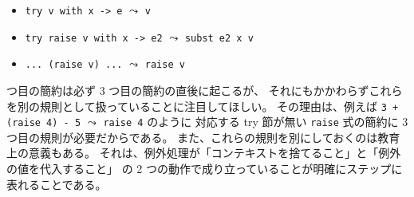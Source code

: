 \begin{itemize}
  \item \texttt{try v with x -> e} $\leadsto$ \texttt{v}
  \item \texttt{try raise v with x -> e2} $\leadsto$ \texttt{subst e2 x v}
  \item \texttt{...\ (raise v) ...} $\leadsto$ \texttt{raise v}
\end{itemize}

 つ目の簡約は必ず 3 つ目の簡約の直後に起こるが、
それにもかかわらずこれらを別の規則として扱っていることに注目してほしい。
その理由は、例えば \texttt{3 + (raise 4) - 5} $\leadsto$ \texttt{raise 4} のように
対応する try 節が無い \texttt{raise} 式の簡約に 3 つ目の規則が必要だからである。
また、これらの規則を別にしておくのは教育上の意義もある。
それは、例外処理が「コンテキストを捨てること」と「例外の値を代入すること」
の 2 つの動作で成り立っていることが明確にステップに表れることである。


